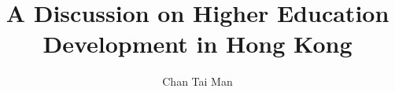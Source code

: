 \documentclass[a4paper,12pt,twoside,times,numbered,PageStyleIII]{PhDThesisPSnPDF}
\title{A Discussion on Higher Education Development in Hong Kong}
\author{Chan Tai Man}
\begin{document}
\frontmatter

\maketitle





\tableofcontents

\listoffigures

\listoftables



\mainmatter




\begin{spacing}{0.9}

\nocite{*}

\cleardoublepage





\end{spacing}


\begin{appendices} %



\end{appendices}
\end{document}
